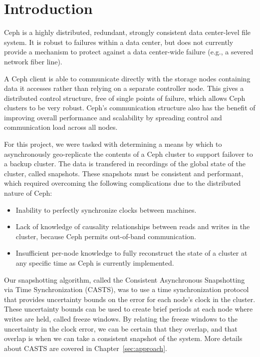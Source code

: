 \chapter{Introduction}
\label{sec:introduction}

Ceph is a highly distributed, redundant, strongly consistent data
center-level file system. It is robust to failures within a data
center, but does not currently provide a mechanism to protect against
a data center-wide failure (e.g., a severed network fiber line).

A Ceph client is able to communicate directly with the storage nodes
containing data it accesses rather than relying on a separate
controller node. This gives a distributed control structure, free of
single points of failure, which allows Ceph clusters to be very
robust. Ceph's communication structure also has the benefit of improving
overall performance and scalability by spreading control and
communication load across all nodes.

For this project, we were tasked with determining a means by which to
asynchronously geo-replicate the contents of a Ceph cluster to support failover to a backup cluster. The data is 
transfered in recordings of the global state of the cluster, called snapshots.
These snapshots must be consistent and performant, which required overcoming 
the following complications due to the distributed nature of Ceph:

\begin{itemize}
\item Inability to perfectly synchronize clocks between machines.
\item Lack of knowledge of causality relationships between reads and
  writes in the cluster, because Ceph permits out-of-band
  communication.
\item Insufficient per-node knowledge to fully reconstruct the state
  of a cluster at any specific time as Ceph is currently implemented.
\end{itemize}

Our snapshotting algorithm, called the Consistent Asynchronous Snapshotting via Time Synchronization (CASTS), was to use a time synchronization protocol that provides
uncertainty bounds on the error for each node's clock in the cluster. These
uncertainty bounds can be used to create brief periods at each node where writes are 
held, called freeze windows. By relating the freeze windows to the uncertainty 
in the clock error, we can be certain that they overlap, and that overlap
is when we can take a consistent snapshot of the system. More details
about CASTS are covered in Chapter~\ref{sec:approach}.

